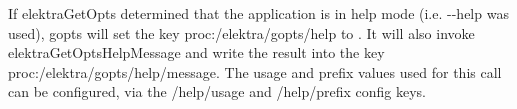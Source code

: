 If {\ttfamily elektra\+Get\+Opts} determined that the application is in help mode (i.\+e. {\ttfamily -\/-\/help} was used), {\ttfamily gopts} will set the key {\ttfamily proc\+:/elektra/gopts/help} to {}. It will also invoke {\ttfamily elektra\+Get\+Opts\+Help\+Message} and write the result into the key {\ttfamily proc\+:/elektra/gopts/help/message}. The {\ttfamily usage} and {\ttfamily prefix} values used for this call can be configured, via the {\ttfamily /help/usage} and {\ttfamily /help/prefix} config keys. 